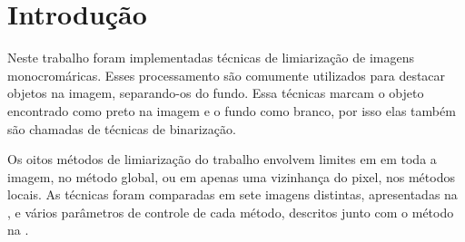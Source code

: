 \section{Introdução} \label{sec:intro}

Neste trabalho foram implementadas técnicas de limiarização de imagens monocromáricas. Esses processamento são comumente utilizados para destacar objetos na imagem, separando-os do fundo. Essa técnicas marcam o objeto encontrado como preto na imagem e o fundo como branco, por isso elas também são chamadas de técnicas de binarização.

Os oitos métodos de limiarização do trabalho envolvem limites em em toda a imagem, no método global, ou em apenas uma vizinhança do pixel, nos métodos locais. As técnicas foram comparadas em sete imagens distintas, apresentadas na , e vários parâmetros de controle de cada método, descritos junto com o método na .
